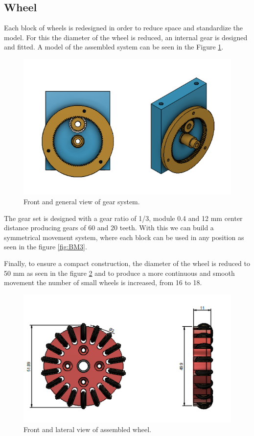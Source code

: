\documentclass{llncs}
\begin{document}
\subsection{Wheel}

Each block of wheels is redesigned in order to reduce space and standardize the model. For this the diameter of the wheel is reduced, an internal gear is designed and fitted. A model of the assembled system can be seen in the Figure \ref{fig:Wheel1}.

\begin{figure}[H]
    \centering
    \includegraphics[scale=0.6]{Images/Engranaje.jpeg}
    \caption{Front and general view of gear system. }
    \label{fig:Wheel1}
\end{figure}

The gear set is designed with a gear ratio of 1/3, module 0.4 and 12 mm center distance producing gears of 60 and 20 teeth. With this we can build a symmetrical movement system, where each block can be used in any position as seen in the figure \ref{fig:BM3}.

Finally, to ensure a compact construction, the diameter of the wheel is reduced to 50 mm as seen in the figure \ref{fig:Wheel2} and to produce a more continuous and smooth movement the number of small wheels is increased, from 16 to 18.

\begin{figure}[h]
    \centering
    \includegraphics[scale=0.6]{Images/Wheel.jpeg}
    \caption{Front and lateral view of assembled wheel. }
    \label{fig:Wheel2}
\end{figure}
\end{document}
